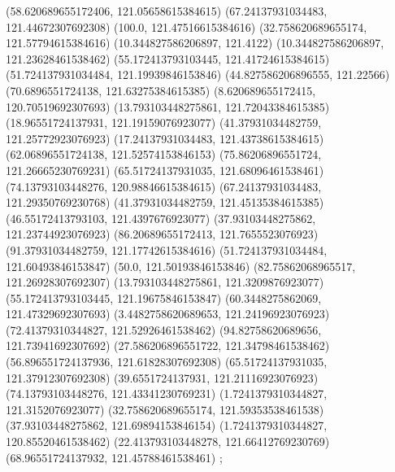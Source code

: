 {{{		(58.620689655172406, 121.05658615384615)
		(67.24137931034483, 121.44672307692308)
		(100.0, 121.47516615384616)
		(32.758620689655174, 121.57794615384616)
		(10.344827586206897, 121.4122)
		(10.344827586206897, 121.23628461538462)
		(55.172413793103445, 121.41724615384615)
		(51.724137931034484, 121.19939846153846)
		(44.827586206896555, 121.22566)
		(70.6896551724138, 121.63275384615385)
		(8.620689655172415, 120.70519692307693)
		(13.793103448275861, 121.72043384615385)
		(18.96551724137931, 121.19159076923077)
		(41.37931034482759, 121.25772923076923)
		(17.24137931034483, 121.43738615384615)
		(62.06896551724138, 121.52574153846153)
		(75.86206896551724, 121.26665230769231)
		(65.51724137931035, 121.68096461538461)
		(74.13793103448276, 120.98846615384615)
		(67.24137931034483, 121.29350769230768)
		(41.37931034482759, 121.45135384615385)
		(46.55172413793103, 121.4397676923077)
		(37.93103448275862, 121.23744923076923)
		(86.20689655172413, 121.7655523076923)
		(91.37931034482759, 121.17742615384616)
		(51.724137931034484, 121.60493846153847)
		(50.0, 121.50193846153846)
		(82.75862068965517, 121.26928307692307)
		(13.793103448275861, 121.3209876923077)
		(55.172413793103445, 121.19675846153847)
		(60.3448275862069, 121.47329692307693)
		(3.4482758620689653, 121.24196923076923)
		(72.41379310344827, 121.52926461538462)
		(94.82758620689656, 121.73941692307692)
		(27.586206896551722, 121.34798461538462)
		(56.896551724137936, 121.61828307692308)
		(65.51724137931035, 121.37912307692308)
		(39.6551724137931, 121.21116923076923)
		(74.13793103448276, 121.43341230769231)
		(1.7241379310344827, 121.3152076923077)
		(32.758620689655174, 121.59353538461538)
		(37.93103448275862, 121.69894153846154)
		(1.7241379310344827, 120.85520461538462)
		(22.413793103448278, 121.66412769230769)
		(68.96551724137932, 121.45788461538461)
	};

}}
